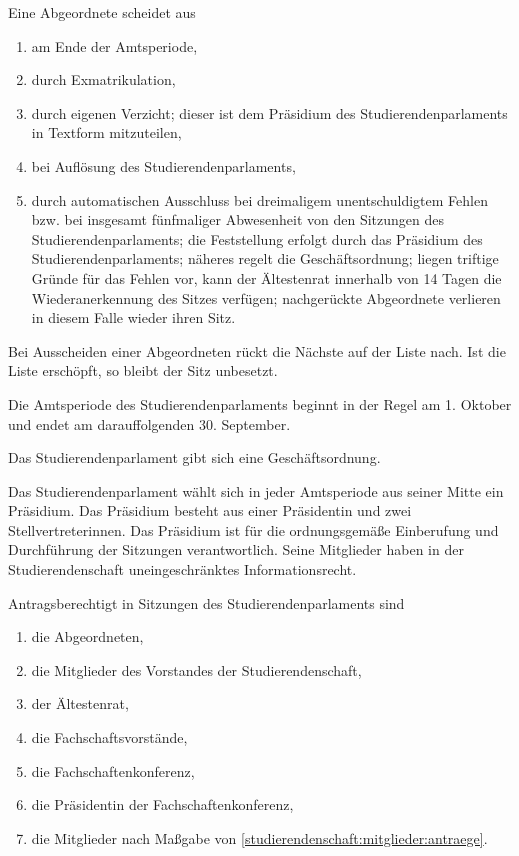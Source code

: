 Eine Abgeordnete scheidet aus \label{stupa:zusammensetzung:ausscheiden} 
  \begin{enumerate}
  \item am Ende der Amtsperiode,
  \item durch Exmatrikulation,
  \item durch eigenen Verzicht; dieser ist dem Präsidium des Studierendenparlaments in Textform mitzuteilen,
  \item bei Auflösung des Studierendenparlaments,
  \item durch automatischen Ausschluss bei dreimaligem unentschuldigtem Fehlen bzw. bei insgesamt fünfmaliger Abwesenheit von den Sitzungen des Studierendenparlaments; die Feststellung erfolgt durch das Präsidium des Studierendenparlaments; näheres regelt die Geschäftsordnung; liegen triftige Gründe für das Fehlen vor, kann der Ältestenrat innerhalb von 14 Tagen die Wiederanerkennung des Sitzes verfügen; nachgerückte Abgeordnete verlieren in diesem Falle wieder ihren Sitz. \label{stupa:zusammensetzung:ausscheiden:wiederanerkennung}
\end{enumerate}
Bei Ausscheiden einer Abgeordneten rückt die Nächste auf der Liste nach. Ist die Liste erschöpft, so bleibt der Sitz unbesetzt.

Die Amtsperiode des Studierendenparlaments beginnt in der Regel am 1. Oktober und endet am darauffolgenden 30. September.



Das Studierendenparlament gibt sich eine Geschäftsordnung.

Das Studierendenparlament wählt sich in jeder Amtsperiode aus seiner Mitte ein Präsidium. Das Präsidium besteht aus einer Präsidentin und zwei Stellvertreterinnen. Das Präsidium ist für die ordnungsgemäße Einberufung und Durchführung der Sitzungen verantwortlich. Seine Mitglieder haben in der Studierendenschaft uneingeschränktes Informationsrecht.

Antragsberechtigt in Sitzungen des Studierendenparlaments sind
  \begin{enumerate}
  \item die Abgeordneten,
  \item die Mitglieder des Vorstandes der Studierendenschaft,
  \item der Ältestenrat,
  \item die Fachschaftsvorstände,
  \item die Fachschaftenkonferenz,
  \item die Präsidentin der Fachschaftenkonferenz,
  \item die Mitglieder nach Maßgabe von \ref{studierendenschaft:mitglieder:antraege}.
  \end{enumerate}

